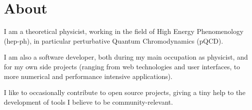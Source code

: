 \section{About}
I am a theoretical physicist, working in the field of High Energy Phenomenology
(hep-ph), in particular perturbative Quantum Chromodynamics (pQCD).\newline

I am also a software developer, both during my main occupation as physicist,
and for my own side projects (ranging from web technologies and user
interfaces, to more numerical and performance intensive applications).

I like to occasionally contribute to open source projects, giving a tiny help
to the development of tools I believe to be community-relevant.
